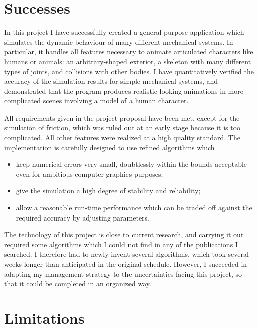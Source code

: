 \section{Successes}

In this project I have successfully created a general-purpose application which simulates
the dynamic behaviour of many different mechanical systems. In particular, it handles all
features necessary to animate articulated characters like humans or animals: an
arbitrary-shaped exterior, a skeleton with many different types of joints, and
collisions with other bodies. I have quantitatively verified the accuracy of the simulation
results for simple mechanical systems, and demonstrated that the program produces
realistic-looking animations in more complicated scenes involving a
model of a human character.

All requirements given in the project proposal have been met, except for the simulation of friction,
which was ruled out at an early stage because it is too complicated. All other features were
realized at a high quality standard. The implementation is carefully designed to use refined
algorithms which 
\begin{itemize}
\item keep numerical errors very small, doubtlessly within the bounds acceptable even for
    ambitious computer graphics purposes;
\item give the simulation a high degree of stability and reliability;
\item allow a reasonable run-time performance which can be traded off against the required
    accuracy by adjusting parameters.
\end{itemize}

The technology of this project is close to current research, and carrying it out
required some algorithms which I could not find in any of the publications I searched. I therefore
had to newly invent several algorithms, which took several weeks longer than anticipated in
the original schedule. However, I succeeded in adapting my management strategy
to the uncertainties facing this project, so that it could be completed in an organized way.

\section{Limitations}

